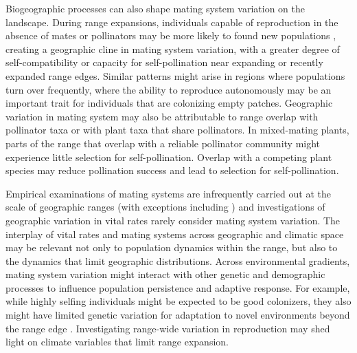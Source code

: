 \documentclass{article}
\begin{document}
Biogeographic processes can also shape mating system variation on the landscape. During range expansions, individuals capable of reproduction in the absence of mates or pollinators may be more likely to found new populations \citep{baker1955self, pannell2015scope}, creating a geographic cline in mating system variation, with a greater degree of self-compatibility or capacity for self-pollination near expanding or recently expanded range edges. Similar patterns might arise in regions where populations turn over frequently, where the ability to reproduce autonomously may be an important trait for individuals that are colonizing empty patches. Geographic variation in mating system may also be attributable to range overlap with pollinator taxa or with plant taxa that share pollinators. In mixed-mating plants, parts of the range that overlap with a reliable pollinator community might experience little selection for self-pollination. Overlap with a competing plant species may reduce pollination success and lead to selection for self-pollination.

Empirical examinations of mating systems are infrequently carried out at the scale of geographic ranges (with exceptions including \citealt{busch2005evolution, herlihy2005evolution, moeller2005ecologicalcontext, dart2011broad, mimura2007adaptive}) and investigations of geographic variation in vital rates rarely consider mating system variation. The interplay of vital rates and mating systems across geographic and climatic space may be relevant not only to population dynamics within the range, but also to the dynamics that limit geographic distributions. Across environmental gradients, mating system variation might interact with other genetic and demographic processes to influence population persistence and adaptive response. For example, while highly selfing individuals might be expected to be good colonizers, they also might have limited genetic variation for adaptation to novel environments beyond the range edge \citep{wright2013evolutionary}. Investigating range-wide variation in reproduction may shed light on climate variables that limit range expansion.
\end{document}
